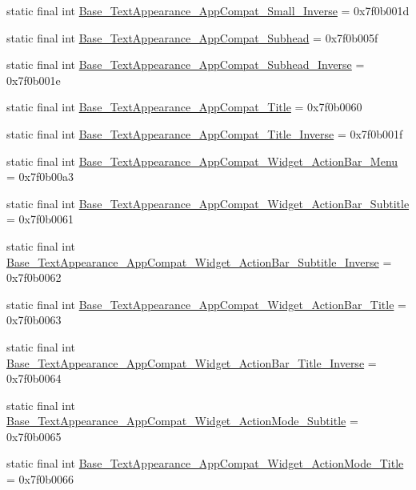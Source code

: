 \begin{CompactItemize}
\item 
static final int \hyperlink{classandroid_1_1support_1_1v4_1_1_r_1_1style_c79373424fbbc83a2b2fd907705773b8}{Base\_\-TextAppearance\_\-AppCompat\_\-Small\_\-Inverse} = 0x7f0b001d
\item 
static final int \hyperlink{classandroid_1_1support_1_1v4_1_1_r_1_1style_ebffd7f316f57341aaed3a7d7d1f6a43}{Base\_\-TextAppearance\_\-AppCompat\_\-Subhead} = 0x7f0b005f
\item 
static final int \hyperlink{classandroid_1_1support_1_1v4_1_1_r_1_1style_e01022b793253e089603b8539f6104f9}{Base\_\-TextAppearance\_\-AppCompat\_\-Subhead\_\-Inverse} = 0x7f0b001e
\item 
static final int \hyperlink{classandroid_1_1support_1_1v4_1_1_r_1_1style_5bd8b4362062c608fffc51dc080100a9}{Base\_\-TextAppearance\_\-AppCompat\_\-Title} = 0x7f0b0060
\item 
static final int \hyperlink{classandroid_1_1support_1_1v4_1_1_r_1_1style_173f9f3ef15b804569e27005b4df551d}{Base\_\-TextAppearance\_\-AppCompat\_\-Title\_\-Inverse} = 0x7f0b001f
\item 
static final int \hyperlink{classandroid_1_1support_1_1v4_1_1_r_1_1style_84f6ed5f413dbf72f0c4c667384733bf}{Base\_\-TextAppearance\_\-AppCompat\_\-Widget\_\-ActionBar\_\-Menu} = 0x7f0b00a3
\item 
static final int \hyperlink{classandroid_1_1support_1_1v4_1_1_r_1_1style_e8d2d6232e2289bcae9fa8839490f3fd}{Base\_\-TextAppearance\_\-AppCompat\_\-Widget\_\-ActionBar\_\-Subtitle} = 0x7f0b0061
\item 
static final int \hyperlink{classandroid_1_1support_1_1v4_1_1_r_1_1style_fe930a1d30f433b76a80729fc4712a72}{Base\_\-TextAppearance\_\-AppCompat\_\-Widget\_\-ActionBar\_\-Subtitle\_\-Inverse} = 0x7f0b0062
\item 
static final int \hyperlink{classandroid_1_1support_1_1v4_1_1_r_1_1style_e61a58e0fcbd48150d9775fd1e5ba092}{Base\_\-TextAppearance\_\-AppCompat\_\-Widget\_\-ActionBar\_\-Title} = 0x7f0b0063
\item 
static final int \hyperlink{classandroid_1_1support_1_1v4_1_1_r_1_1style_499655211a424f8fad8a4b56d9ac94e7}{Base\_\-TextAppearance\_\-AppCompat\_\-Widget\_\-ActionBar\_\-Title\_\-Inverse} = 0x7f0b0064
\item 
static final int \hyperlink{classandroid_1_1support_1_1v4_1_1_r_1_1style_7927717bc11a3a48fd924496f2f1ea3d}{Base\_\-TextAppearance\_\-AppCompat\_\-Widget\_\-ActionMode\_\-Subtitle} = 0x7f0b0065
\item 
static final int \hyperlink{classandroid_1_1support_1_1v4_1_1_r_1_1style_c5168d22462f717cfc003acc9c167dea}{Base\_\-TextAppearance\_\-AppCompat\_\-Widget\_\-ActionMode\_\-Title} = 0x7f0b0066

\end{CompactItemize}
